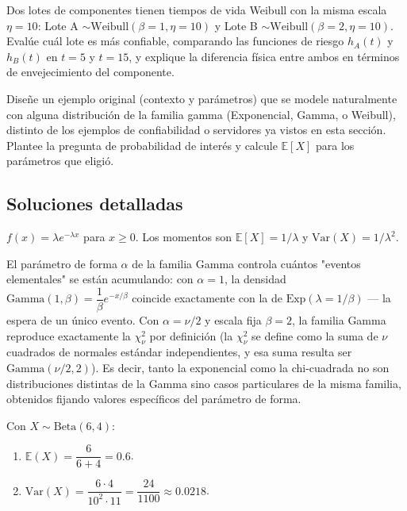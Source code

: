 \begin{problema}
	\label{prob:0f44096}
	Dos lotes de componentes tienen tiempos de vida Weibull con la misma escala $\eta=10$: Lote A $\sim \text{Weibull}(\beta=1,\eta=10)$ y Lote B $\sim \text{Weibull}(\beta=2,\eta=10)$. Evalúe cuál lote es más confiable, comparando las funciones de riesgo $h_A(t)$ y $h_B(t)$ en $t=5$ y $t=15$, y explique la diferencia física entre ambos en términos de envejecimiento del componente.
\end{problema}

\begin{problema}
	\label{prob:31a003b}
	Diseñe un ejemplo original (contexto y parámetros) que se modele naturalmente con alguna distribución de la familia gamma (Exponencial, Gamma, o Weibull), distinto de los ejemplos de confiabilidad o servidores ya vistos en esta sección. Plantee la pregunta de probabilidad de interés y calcule $\mathbb{E}[X]$ para los parámetros que eligió.
\end{problema}

\subsection*{Soluciones detalladas}

\begin{solproblema}[prob:f00c4b6]
	$f(x) = \lambda e^{-\lambda x}$ para $x\ge0$. Los momentos son $\mathbb{E}[X] = 1/\lambda$ y $\text{Var}(X) = 1/\lambda^2$.
\end{solproblema}

\begin{solproblema}[prob:de365e8]
	El parámetro de forma $\alpha$ de la familia Gamma controla cuántos "eventos elementales" se están acumulando: con $\alpha=1$, la densidad $\text{Gamma}(1,\beta) = \dfrac{1}{\beta}e^{-x/\beta}$ coincide exactamente con la de $\text{Exp}(\lambda=1/\beta)$ — la espera de un único evento. Con $\alpha=\nu/2$ y escala fija $\beta=2$, la familia Gamma reproduce exactamente la $\chi^2_\nu$ por definición (la $\chi^2_\nu$ se define como la suma de $\nu$ cuadrados de normales estándar independientes, y esa suma resulta ser $\text{Gamma}(\nu/2,2)$). Es decir, tanto la exponencial como la chi-cuadrada no son distribuciones distintas de la Gamma sino casos particulares de la misma familia, obtenidos fijando valores específicos del parámetro de forma.
\end{solproblema}

\begin{solproblema}[prob:491786c]
	Con $X\sim\text{Beta}(6,4)$:
	\begin{enumerate}
		\item $\mathbb{E}(X) = \dfrac{6}{6+4} = 0.6$.
		\item $\text{Var}(X) = \dfrac{6\cdot4}{10^2\cdot11} = \dfrac{24}{1100} \approx 0.0218$.
	\end{enumerate}
\end{solproblema}

